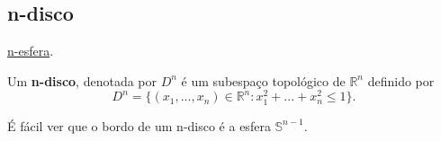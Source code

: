 \subsection{n-disco}
\label{n-disco-def}
\begin{titlemize}
	\item \hyperref[n-esfera-def]{n-esfera}. %
\end{titlemize}
\begin{defi}
     Um \textbf{n-disco}, denotada por $D^n$ é um subespaço topológico de $\mathbb{R}^{n}$ definido por 
     \[D^n=\{(x_1,...,x_n)\in \mathbb{R}^{n}:x_1^2+...+x_n^2\le 1\}.\]
\end{defi}
É fácil ver que o bordo de um n-disco é a esfera $\mathbb{S}^{n-1}$.
